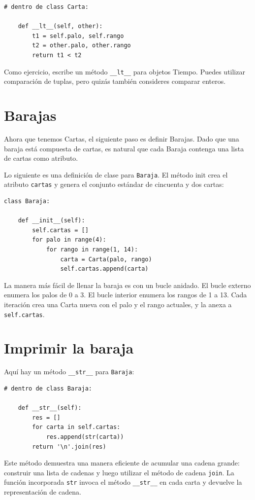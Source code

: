 \documentclass[10pt]{book}
\begin{document}
\begin{verbatim}
# dentro de class Carta:

    def __lt__(self, other):
        t1 = self.palo, self.rango
        t2 = other.palo, other.rango
        return t1 < t2
\end{verbatim}
%
Como ejercicio, escribe un método \verb"__lt__" para objetos Tiempo.  Puedes
utilizar comparación de tuplas, pero quizás también consideres
comparar enteros.


\section{Barajas}

Ahora que tenemos Cartas, el siguiente paso es definir Barajas.  Dado que una
baraja está compuesta de cartas, es natural que cada Baraja contenga una
lista de cartas como atributo.

Lo siguiente es una definición de clase para {\tt Baraja}.  El
método init crea el atributo {\tt cartas} y genera
el conjunto estándar de cincuenta y dos cartas:

\begin{verbatim}
class Baraja:

    def __init__(self):
        self.cartas = []
        for palo in range(4):
            for rango in range(1, 14):
                carta = Carta(palo, rango)
                self.cartas.append(carta)
\end{verbatim}
%
La manera más fácil de llenar la baraja es con un bucle anidado.  El bucle externo
enumera los palos de 0 a 3.  El bucle interior enumera los
rangos de 1 a 13.  Cada iteración
crea una Carta nueva con el palo y el rango actuales,
y la anexa a {\tt self.cartas}.


\section{Imprimir la baraja}
\label{printdeck}

Aquí hay un método \verb"__str__" para {\tt Baraja}:

\begin{verbatim}
# dentro de class Baraja:

    def __str__(self):
        res = []
        for carta in self.cartas:
            res.append(str(carta))
        return '\n'.join(res)
\end{verbatim}
%
Este método demuestra una manera eficiente de acumular una cadena
grande: construir una lista de cadenas y luego utilizar el método de cadena
{\tt join}.  La función incorporada {\tt str} invoca el método
\verb"__str__" en cada carta y devuelve la representación
de cadena.   
  
\end{document}
